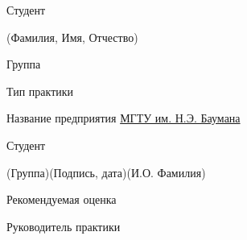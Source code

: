 \documentclass[14pt, russian]{scrartcl}
\begin{document}
\begin{titlepage}
\noindent Студент \underline{\hspace{15.3cm}}

\vspace{-2.1ex}
\noindent\hspace{7.0cm}\scriptsize{(Фамилия, Имя, Отчество)}\normalsize
\bigskip

\noindent Группа \underline{\hspace{2.0cm}} \hfill 

\vspace{-2.1ex}
\noindent\hspace{7.0cm}
\bigskip

\noindent Тип практики \underline{\hspace{14.0cm}} \hfill 

\vspace{-2.1ex}
\noindent\hspace{7.0cm}
\bigskip

\noindent Название предприятия \underline{\hspace{1.5cm} МГТУ им. Н.Э. Баумана\hspace{1.5cm}} \hfill 

\vspace{-2.1ex}
\noindent\hspace{7.0cm}
\bigskip

\vspace{1.5cm}

\noindent Студент \underline{\hspace{1.5cm}} \hfill \underline{\hspace{4cm}}\quad
\underline{\hspace{4cm}}

\vspace{-2.1ex}
\noindent\hspace{9ex}\scriptsize{(Группа)}\normalsize\hspace{160pt}\hspace{2ex}\scriptsize{(Подпись, дата)}\normalsize\hspace{30pt}\hspace{6ex}\scriptsize{(И.О. Фамилия)}\normalsize
\bigskip

\noindent Рекомендуемая оценка \hfill \underline{\hspace{7.0cm}}

\vspace{-2ex}
\noindent\hspace{13.5ex}
\bigskip

\noindent Руководитель практики \hfill \underline{\hspace{4cm}}\quad
\underline{\hspace{4cm}}


\end{titlepage}
\end{document}
